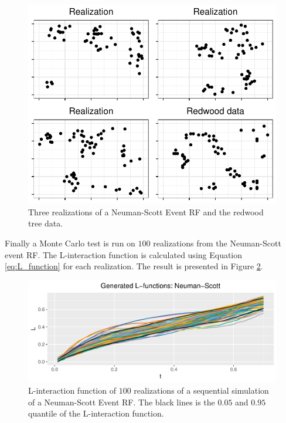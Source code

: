 \begin{figure}
    \centering
    \includegraphics[scale=0.9]{figures/cluster_rel.pdf}
    \caption{Three realizations of a Neuman-Scott Event RF and the redwood tree data.}
    \label{fig:rel_rf}
\end{figure}

Finally a Monte Carlo test is run on $100$ realizations from the Neuman-Scott event RF. The L-interaction function is calculated using Equation \eqref{eq:L_function} for each realization. The result is presented in Figure \ref{fig:gen_ns_l}.

\begin{figure}
    \centering
    \includegraphics[scale=0.8]{figures/gen_ns_l.pdf}
    \caption{L-interaction function of $100$ realizations of a sequential simulation of a Neuman-Scott Event RF. The black lines is the $0.05$ and $0.95$ quantile of the L-interaction function.}
    \label{fig:gen_ns_l}
\end{figure}


